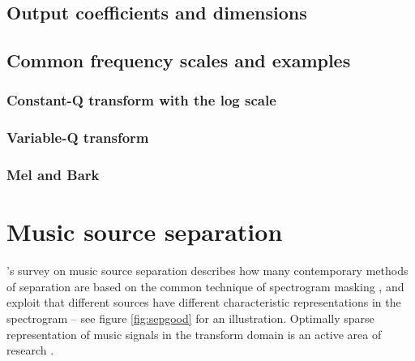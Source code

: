 \documentclass[letter,12pt,notitlepage]{article}
\begin{document}

\subsection{Output coefficients and dimensions}


\subsection{Common frequency scales and examples}

\subsubsection{Constant-Q transform with the log scale}

\subsubsection{Variable-Q transform}

\subsubsection{Mel and Bark}

\vfill
\clearpage

\section{Music source separation}
\label{sec:musicsep}

\citet{musicsepgood}'s survey on music source separation describes how many contemporary methods of separation are based on the common technique of spectrogram masking \cite{masking, speechmask, musicmask}, and exploit that different sources have different characteristic representations in the spectrogram -- see figure \ref{fig:sepgood} for an illustration. Optimally sparse representation of music signals in the transform domain is an active area of research \cite{sparsitykowalski, sparsitykowalski2}.
\end{document}
